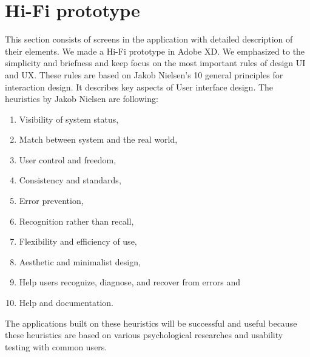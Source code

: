 \section{Hi-Fi prototype}\label{sec:hi-fi-prototype}
This section consists of screens in the application with detailed description of their elements.
We made a Hi-Fi prototype in Adobe XD.
We emphasized to the simplicity and briefness and keep focus on the most important rules of design UI and UX.
These rules are based on Jakob Nielsen's 10 general principles for interaction design.\cite{nnGroup}
It describes key aspects of User interface design.
The heuristics by Jakob Nielsen are following:
\begin{enumerate}
    \item Visibility of system status,
    \item Match between system and the real world,
    \item User control and freedom,
    \item Consistency and standards,
    \item Error prevention,
    \item Recognition rather than recall,
    \item Flexibility and efficiency of use,
    \item Aesthetic and minimalist design,
    \item Help users recognize, diagnose, and recover from errors and
    \item Help and documentation.\cite{nnGroup}
\end{enumerate}

The applications built on these heuristics will be successful and useful because these heuristics are based on various psychological researches and usability testing with common users.














